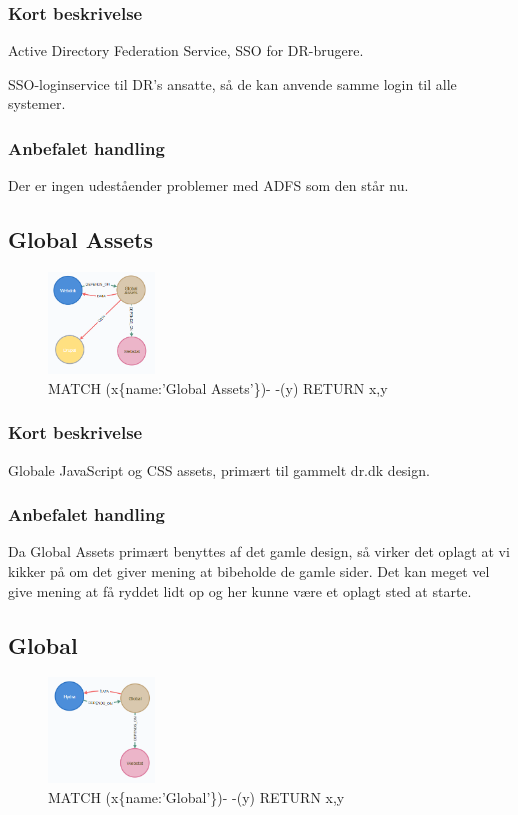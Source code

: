 \documentclass{article}
\begin{document}
\subsubsection{Kort beskrivelse}
Active Directory Federation Service, SSO for DR-brugere.

SSO-loginservice til DR's ansatte, så de kan anvende samme login til alle systemer.
\subsubsection{Anbefalet handling}
Der er ingen udeståender problemer med ADFS som den står nu.


\subsection{Global Assets}
\begin{figure}[h]
\includegraphics[width=80pt]{GlobalAssets.PNG}
\caption{MATCH (x\{name:'Global Assets'\})- -(y) RETURN x,y}
\end{figure}
\subsubsection{Kort beskrivelse}
Globale JavaScript og CSS assets, primært til gammelt dr.dk design.
\subsubsection{Anbefalet handling}
Da Global Assets primært benyttes af det gamle design, så virker det oplagt at vi kikker på om det giver mening at bibeholde de gamle sider. Det kan meget vel give mening at få ryddet lidt op og her kunne være et oplagt sted at starte.


\subsection{Global}
\begin{figure}[h]
\includegraphics[width=80pt]{Global.PNG}
\caption{MATCH (x\{name:'Global'\})- -(y) RETURN x,y}
\end{figure}
\end{document}
